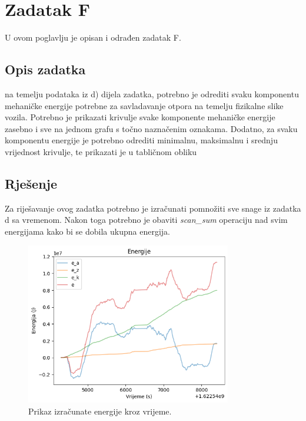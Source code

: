 \chapter{Zadatak F} \label{ch:f}

U ovom poglavlju je opisan i odrađen zadatak F.

\section{Opis zadatka} \label{sec:f:opis}

na temelju podataka iz d) dijela zadatka, potrebno je odrediti svaku komponentu mehaničke energije
potrebne za savladavanje otpora na temelju fizikalne slike vozila. Potrebno je prikazati krivulje svake
komponente mehaničke energije zasebno i sve na jednom grafu s točno naznačenim oznakama.
Dodatno, za svaku komponentu energije je potrebno odrediti minimalnu, maksimalnu i srednju
vrijednost krivulje, te prikazati je u tabličnom obliku

\section{Rješenje} \label{sec:f:rjesenje}

Za riješavanje ovog zadatka potrebno je izračunati pomnožiti sve snage iz zadatka d sa vremenom.
Nakon toga potrebno je obaviti \textit{scan\_sum} operaciju nad svim energijama kako bi se dobila
ukupna energija.

\begin{figure}
    \centering
    \includegraphics[width=0.8\textwidth]{images/energies.png}
    \caption{Prikaz izračunate energije kroz vrijeme.}
    \label{fig:f:energy_graph}
\end{figure}


